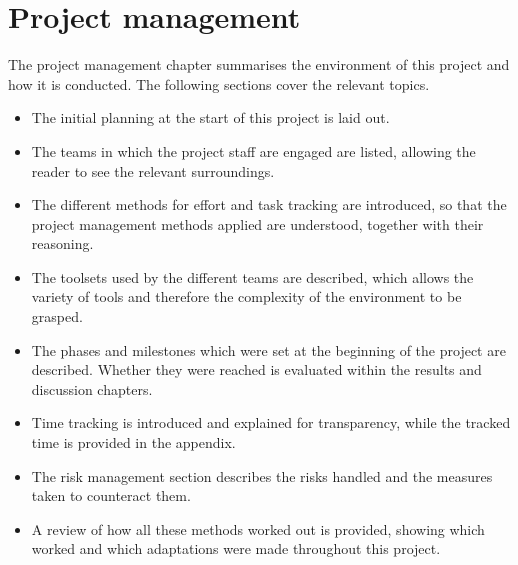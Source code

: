 

\chapter{Project management}

The project management chapter summarises the environment of this project and how it is conducted. The following sections cover the relevant topics.



\begin{itemize}
    \item The initial planning at the start of this project is laid out.
    \item The teams in which the project staff are engaged are listed, allowing the reader to see the relevant surroundings.
    \item The different methods for effort and task tracking are introduced, so that the project management methods applied are understood, together with their reasoning.
    \item The toolsets used by the different teams are described, which allows the variety of tools and therefore the complexity of the environment to be grasped.
    \item The phases and milestones which were set at the beginning of the project are described. Whether they were reached is evaluated within the results and discussion chapters.
    \item Time tracking is introduced and explained for transparency, while the tracked time is provided in the appendix.
    \item The risk management section describes the risks handled and the measures taken to counteract them.
    \item A review of how all these methods worked out is provided, showing which worked and which adaptations were made throughout this project.
\end{itemize}









